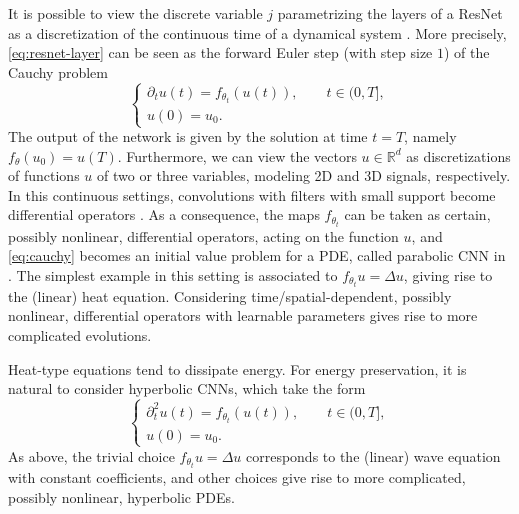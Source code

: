 \documentclass{article}
\theoremstyle{definition}
\newcommand{\R}{\mathbb{R}}
\begin{document}
It is possible to view the discrete variable $j$ parametrizing the layers of a ResNet as a discretization of the continuous time of a dynamical system \cite{e-2017,haber-ruthotto-2018,neuralodes-2018}. More precisely, \eqref{eq:resnet-layer} can be seen as the forward Euler step (with step size $1$) of the Cauchy problem
\begin{equation}\label{eq:cauchy}
    \left\{
\begin{array}{l}
    \partial_t u(t) =f_{\theta_t}(u(t)),\qquad t\in (0,T],  \\
     u(0)=u_0.
\end{array}
    \right.
\end{equation}
The output of the network is given by the solution at time $t=T$, namely
$f_\theta(u_0) = u(T)$. Furthermore, we can view the vectors $u\in\R^d$ as discretizations of functions $u$ of two or three variables, modeling 2D and 3D signals, respectively. In this continuous settings, convolutions with filters with small support become differential operators \cite{haber-ruthotto-2020}. As a consequence, the maps $f_{\theta_t}$ can be taken as certain, possibly nonlinear, differential operators, acting on the function $u$, and \eqref{eq:cauchy} becomes an initial value problem for a PDE, called parabolic CNN in \cite{haber-ruthotto-2020}. The simplest example in this setting is associated to $f_{\theta_t} u=\Delta u$, giving rise to the (linear) heat equation. Considering time/spatial-dependent, possibly nonlinear, differential operators with learnable parameters gives rise to more complicated evolutions.

Heat-type equations tend to dissipate energy. For energy preservation, it is natural to consider hyperbolic CNNs, which take the form
\begin{equation}\label{eq:hyperbolic}
    \left\{
\begin{array}{l}
    \partial^2_t u(t) =f_{\theta_t}(u(t)),\qquad t\in (0,T],  \\
     u(0)=u_0.
\end{array}
    \right.
\end{equation}
As above, the trivial choice $f_{\theta_t} u=\Delta u$ corresponds to the (linear) wave equation with constant coefficients, and other choices give rise to more complicated, possibly nonlinear, hyperbolic PDEs.
\end{document}
